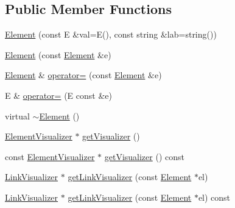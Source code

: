 \subsection*{Public Member Functions}
\begin{DoxyCompactItemize}
\item 
\mbox{\hyperlink{classbridges_1_1datastructure_1_1_element_a21820b1d88f2eb25adfe768bd03046d6}{Element}} (const E \&val=E(), const string \&lab=string())
\item 
\mbox{\hyperlink{classbridges_1_1datastructure_1_1_element_a80eb6ac6925c4974c2e88e7e1446e231}{Element}} (const \mbox{\hyperlink{classbridges_1_1datastructure_1_1_element}{Element}} \&e)
\item 
\mbox{\hyperlink{classbridges_1_1datastructure_1_1_element}{Element}} \& \mbox{\hyperlink{classbridges_1_1datastructure_1_1_element_a6446ad27ba42a854ff93b74b4d7eb3cb}{operator=}} (const \mbox{\hyperlink{classbridges_1_1datastructure_1_1_element}{Element}} \&e)
\item 
E \& \mbox{\hyperlink{classbridges_1_1datastructure_1_1_element_a18ffc753328275e95bb1ee967f88a00a}{operator=}} (E const \&e)
\item 
virtual \mbox{\hyperlink{classbridges_1_1datastructure_1_1_element_ad7ed60da8ed4a31b7a2678d0aa5db205}{$\sim$\+Element}} ()
\item 
\mbox{\hyperlink{classbridges_1_1datastructure_1_1_element_visualizer}{Element\+Visualizer}} $\ast$ \mbox{\hyperlink{classbridges_1_1datastructure_1_1_element_ad4f9ca479938bacd4586df8e7ede2116}{get\+Visualizer}} ()
\item 
const \mbox{\hyperlink{classbridges_1_1datastructure_1_1_element_visualizer}{Element\+Visualizer}} $\ast$ \mbox{\hyperlink{classbridges_1_1datastructure_1_1_element_a75a7770c3b6b1a6cd826293ea33d2d0a}{get\+Visualizer}} () const
\item 
\mbox{\hyperlink{classbridges_1_1datastructure_1_1_link_visualizer}{Link\+Visualizer}} $\ast$ \mbox{\hyperlink{classbridges_1_1datastructure_1_1_element_a531bde8ec32ef31b6d88af37cb029d86}{get\+Link\+Visualizer}} (const \mbox{\hyperlink{classbridges_1_1datastructure_1_1_element}{Element}} $\ast$el)
\item 
\mbox{\hyperlink{classbridges_1_1datastructure_1_1_link_visualizer}{Link\+Visualizer}} $\ast$ \mbox{\hyperlink{classbridges_1_1datastructure_1_1_element_a5e3b55d5098d72d4a83b68a60584a3a1}{get\+Link\+Visualizer}} (const \mbox{\hyperlink{classbridges_1_1datastructure_1_1_element}{Element}} $\ast$el) const
\item 

\end{DoxyCompactItemize}

